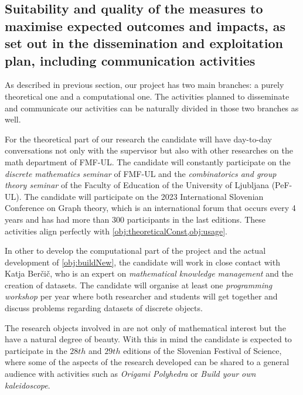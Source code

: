 \subsection{Suitability and quality of the measures to maximise expected outcomes and impacts, as set out in the dissemination and exploitation plan, including communication activities}
\label{sec:suitability}

As described in previous section, our project has two main branches: a purely theoretical one and a computational one. The activities planned to disseminate and communicate our activities can be naturally divided in those two branches as well.

For the theoretical part of our research the candidate will have day-to-day conversations not only with the supervisor but also with other researches on the math department of FMF-UL. The candidate will constantly participate on the \emph{discrete mathematics seminar} of FMF-UL and the \emph{combinatorics and group theory seminar} of the Faculty of Education of the University of Ljubljana (PeF-UL). The candidate will participate on the 2023 International Slovenian Conference on Graph theory, which is an international forum that occurs every 4 years and has had more than 300 participants in the last editions.
These activities align perfectly with \cref{obj:theoreticalConst,obj:usage}.


In other to develop the computational part of the project and the actual development of \cref{obj:buildNew}, the candidate will work in close contact with Katja Berčič, who is an expert on \emph{mathematical knowledge management} and the creation of datasets.
The candidate will organise at least one \emph{programming workshop} per year where both researcher and students will get together and discuss problems regarding datasets of discrete objects.

The research objects involved in \ourp are not only of mathematical interest but the have a natural degree of beauty. With this in mind the candidate is expected to participate in the $28th$ and $29th$ editions of the Slovenian Festival of Science, where some of the aspects of the research developed can be shared to a general audience with activities such as \emph{Origami Polyhedra} or \emph{Build your own kaleidoscope}.


